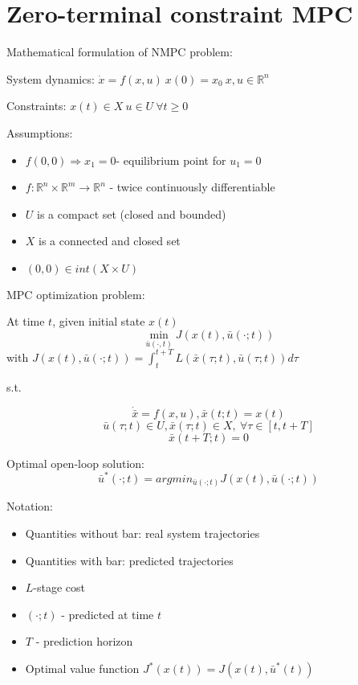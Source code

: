 \chapter{Zero-terminal constraint MPC}

Mathematical formulation of NMPC problem:

System dynamics: $\dot x = f(x,u) \ x(0) = x_0 \ x,u \in \mathbb{R}^n$

Constraints: $x(t) \in X \ u \in U \ \forall t \geq 0$

Assumptions:
\begin{itemize}
\item $f(0,0) \Rightarrow x_1=0 $- equilibrium point for $u_1 = 0$
\item $f: \mathbb{R}^n \times \mathbb{R}^m \to \mathbb{R}^n$ - twice continuously differentiable
\item $U$ is a compact set (closed and bounded)
\item $X$ is a connected and closed set
\item $(0,0) \in int(X \times U)$ 
\end{itemize}

MPC optimization problem:

At time $t$, given initial state $x(t)$
\begin{equation*}
\min_{\bar u(\cdot,t)} J(x(t),\bar u(\cdot ;t))
\end{equation*}
with $J(x(t),\bar u(\cdot;t)) = \int_{t}^{t+T}L(\bar x(\tau;t),\bar u(\tau;t))d\tau$

s.t.

\begin{equation*}
\dot{\bar x} = f(x,u), \bar x(t;t) = x(t)
\end{equation*}
\begin{equation*}
\bar u(\tau;t) \in U, \bar x(\tau;t) \in X, \  \forall \tau \in [t, t +T] 
\end{equation*}
\begin{equation*}
\bar x(t+T;t) = 0
\end{equation*}

Optimal open-loop solution: 
\begin{equation*}
\bar u^* (\cdot;t) = arg min_{\bar u(\cdot;t)} J(x(t), \bar u(\cdot; t))
\end{equation*}

Notation:
\begin{itemize}
\item Quantities without bar: real system trajectories
\item Quantities with bar: predicted trajectories
\item $L$-stage cost
\item $(\cdot;t)$ - predicted at time $t$
\item $T$ - prediction horizon
\item Optimal value function $J^*(x(t)) = J(x(t), \bar u^*(t))$
\end{itemize}

